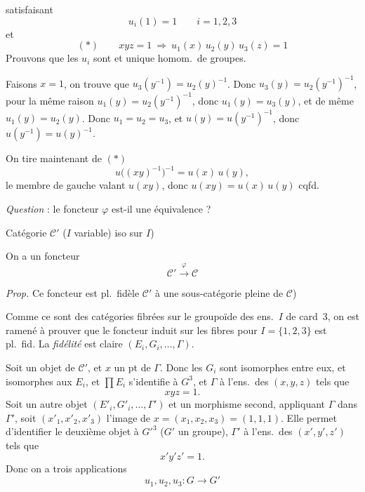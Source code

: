 \documentclass[11pt,a4paper]{article}
\begin{document}
satisfaisant
\[
  u_i(1)=1 \qquad i=1,2,3
\]
et
\[
  (*)\qquad xyz=1\ \Longrightarrow\ u_1(x)\,u_2(y)\,u_3(z)=1
\]
Prouvons que les $u_i$ sont   et unique homom.\ de groupes.

Faisons $x=1$, on trouve que $u_3(y^{-1})=u_2(y)^{-1}$. Donc $u_3(y)=u_2(y^{-1})^{-1}$, pour la même raison $u_1(y)=u_2(y^{-1})^{-1}$, donc $u_1(y)=u_3(y)$, et de même $u_1(y)=u_2(y)$. Donc $u_1=u_2=u_3$, et $u(y)=u(y^{-1})^{-1}$, donc  $u(y^{-1})=u(y)^{-1}$.

On tire maintenant de $(*)$
\[
  u\bigl((xy)^{-1}\bigr)^{-1}=u(x)\,u(y),
\]
le membre de gauche valant $u(xy)$, donc $u(xy)=u(x)\,u(y)$ cqfd.

\emph{Question} : le foncteur $\varphi$ est-il une équivalence ?

Catégorie $\mathcal{C}'$ ($I$ variable)  iso sur $I$)

On a un foncteur
\[
  \mathcal{C}'\xrightarrow{\ \varphi\ }\mathcal{C}
\]

\emph{Prop.} Ce foncteur est pl.\ fidèle  $\mathcal{C}'$ à une sous-catégorie pleine de $\mathcal{C}$)

Comme ce sont des catégories fibrées sur le groupoïde des ens.\ $I$ de card~$3$, on est ramené à prouver que le foncteur induit sur les fibres pour $I=\{1,2,3\}$ \struck{\ill{}}  est pl.\ fid. \struck{\ill{}} La \emph{fidélité} est claire $(E_i,G_i,\ldots,\Gamma)$.

Soit un objet de $\mathcal{C}'$, et $x$  un pt de $\Gamma$. Donc les $G_i$ sont isomorphes entre eux, et isomorphes aux $E_i$, et $\prod E_i$ s'identifie à $G^3$, et $\Gamma$ à l'ens.\ des $(x,y,z)$ tels que
\[
  xyz=1 .
\]
Soit un autre objet $(E'_i,G'_i,\ldots,\Gamma')$ et \ill{} un morphisme   \ill{} second, appliquant $\Gamma$ dans $\Gamma'$, soit $(x'_1,x'_2,x'_3)$ l'image de $x=(x_1,x_2,x_3)=(1,1,1)$. Elle permet d'identifier le deuxième objet à $G'^3$ ($G'$ un groupe), $\Gamma'$ à l'ens.\ des $(x',y',z')$ tels que
\[
  x'y'z'=1 .
\]
Donc on a trois applications
\[
  u_1,u_2,u_3 : G\to G'
\]
\end{document}

